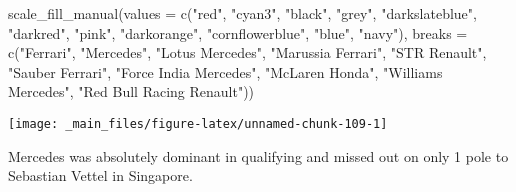 \documentclass[
]{book}
\newenvironment{Shaded}{\begin{snugshade}}{\end{snugshade}}
\newcommand{\AttributeTok}[1]{\textcolor[rgb]{0.77,0.63,0.00}{#1}}
\newcommand{\FunctionTok}[1]{\textcolor[rgb]{0.00,0.00,0.00}{#1}}
\newcommand{\NormalTok}[1]{#1}
\newcommand{\StringTok}[1]{\textcolor[rgb]{0.31,0.60,0.02}{#1}}
\begin{document}
\begin{Shaded}
\begin{Highlighting}[]
  \FunctionTok{scale\_fill\_manual}\NormalTok{(}\AttributeTok{values =} \FunctionTok{c}\NormalTok{(}\StringTok{"red"}\NormalTok{, }
                                \StringTok{"cyan3"}\NormalTok{,  }
                                \StringTok{"black"}\NormalTok{, }
                                \StringTok{"grey"}\NormalTok{,}
                               \StringTok{"darkslateblue"}\NormalTok{, }
                                \StringTok{"darkred"}\NormalTok{,  }
                                \StringTok{"pink"}\NormalTok{, }
                                \StringTok{"darkorange"}\NormalTok{, }
                                \StringTok{"cornflowerblue"}\NormalTok{,}
                               \StringTok{"blue"}\NormalTok{,}
                               \StringTok{"navy"}\NormalTok{),}
                     \AttributeTok{breaks =} \FunctionTok{c}\NormalTok{(}\StringTok{"Ferrari"}\NormalTok{,}
                                 \StringTok{"Mercedes"}\NormalTok{,}
                                 \StringTok{"Lotus Mercedes"}\NormalTok{,}
                                 \StringTok{"Marussia Ferrari"}\NormalTok{,}
                                \StringTok{"STR Renault"}\NormalTok{,}
                                 \StringTok{"Sauber Ferrari"}\NormalTok{, }
                                 \StringTok{"Force India Mercedes"}\NormalTok{,}
                                 \StringTok{"McLaren Honda"}\NormalTok{,}
                                 \StringTok{"Williams Mercedes"}\NormalTok{,}
                                 \StringTok{"Red Bull Racing Renault"}\NormalTok{))}
\end{Highlighting}
\end{Shaded}

\begin{center}\texttt{[image: \_main\_files/figure-latex/unnamed-chunk-109-1]} \end{center}

Mercedes was absolutely dominant in qualifying and missed out on only 1 pole to Sebastian Vettel in Singapore.
\end{document}
